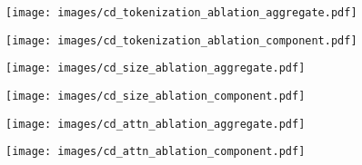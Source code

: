 \begin{figure*}[htbp]
    \centering

    \vspace{1ex} %

    \begin{minipage}{0.48\textwidth}
        \centering
        \texttt{[image: images/cd\_tokenization\_ablation\_aggregate.pdf]}
        \label{fig:cd_tokenization_ablation_aggregate}
    \end{minipage}%
    \hfill
    \begin{minipage}{0.48\textwidth}
        \centering
        \texttt{[image: images/cd\_tokenization\_ablation\_component.pdf]}
        \label{fig:cd_tokenization_ablation_component}
    \end{minipage}

    \vspace{1ex} %

    \begin{minipage}{0.48\textwidth}
        \centering
        \texttt{[image: images/cd\_size\_ablation\_aggregate.pdf]}
        \label{fig:cd_size_ablation_aggregate}
    \end{minipage}%
    \hfill
    \begin{minipage}{0.48\textwidth}
        \centering
        \texttt{[image: images/cd\_size\_ablation\_component.pdf]}
        \label{fig:cd_size_ablation_component}
    \end{minipage}

    \vspace{1ex} %

    \begin{minipage}{0.48\textwidth}
        \centering
        \texttt{[image: images/cd\_attn\_ablation\_aggregate.pdf]}
        \label{fig:cd_attn_ablation_aggregate}
    \end{minipage}%
    \hfill
    \begin{minipage}{0.48\textwidth}
        \centering
        \texttt{[image: images/cd\_attn\_ablation\_component.pdf]}
        \label{fig:cd_attn_ablation_component}
    \end{minipage}


\end{figure*}
